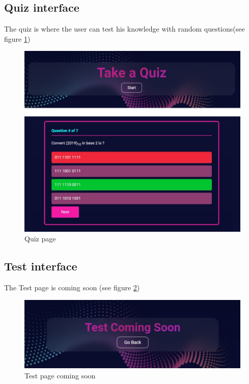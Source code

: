 \subsection{Quiz interface}
The quiz is where the user can test his knowledge with random questions(see figure \ref{fig:quiz})
\begin{figure}[ht]
	\centering
	\label{}\includegraphics[scale=0.6]{img/29.jpg}                
	\caption{Quiz page} 
	\label{fig:quiz}
\end{figure} 

\newpage
\subsection{Test interface}
The Test page is coming soon (see figure \ref{fig:test})

\begin{figure}[ht]
	\centering
	\label{}\includegraphics[scale=0.6]{img/30.jpg}                
	\caption{Test page coming soon} 
	\label{fig:test}
\end{figure} 

